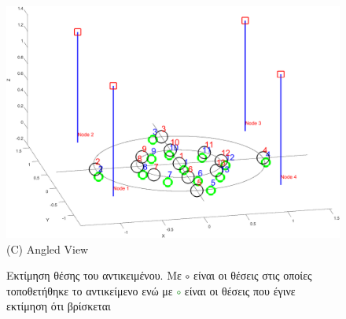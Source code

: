\begin{figure} [H]
\begin{minipage}{\textwidth}
    \includegraphics[width=.8\linewidth]{../Images/Experiments-Results/nodes-pos-with-est-angle.png}\\
    {(C) Angled View}
  \end{minipage}
    \hfill \break
    \decoRule
    \caption[Εκτίμηση θέσης του αντικειμένου.]{Εκτίμηση θέσης του αντικειμένου. Με \textcolor{black}{\LARGE$\circ$} είναι οι θέσεις στις οποίες τοποθετήθηκε το αντικείμενο ενώ με \textcolor{green}{\LARGE$\circ$} είναι οι θέσεις που έγινε εκτίμηση ότι βρίσκεται} %
    \label{fig:multi-exp-pos-estimations}
\end{figure}



